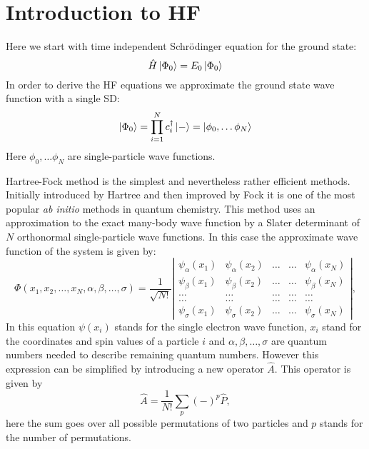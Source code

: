 \documentclass[twoside,english]{uiofysmaster}
\theoremstyle{definition}
\begin{document}
\section{Introduction to HF}
Here we start with time independent Schrödinger equation for the ground state:
\begin{equation}
\hat{H}\ket{\Phi_0}=E_0\ket{\Phi_0}
\end{equation}
In order to derive the HF equations we approximate the ground state wave function with a single SD:
\begin{equation}
\ket{\Phi_0}=\prod_{i=1}^{N}c_i^\dagger\ket{-}=\ket{\phi_0, \dots \phi_N}
\end{equation}
Here $\phi_0, \dots \phi_N$ are single-particle wave functions.

Hartree-Fock method is the simplest and nevertheless rather efficient methods. Initially introduced by Hartree and then improved by Fock it is one of the most popular \textit{ab initio} methods in quantum chemistry. This method uses an approximation to the exact many-body wave function by a Slater determinant of $N$ orthonormal single-particle wave functions. In this case the approximate wave function of the system is given by:
\begin{equation}
\Phi(x_1, x_2,\dots ,x_N,\alpha,\beta,\dots, \sigma)=\frac{1}{\sqrt{N!}}
\left| \begin{array}{ccccc} \psi_{\alpha}(x_1)& \psi_{\alpha}(x_2)& \dots & \dots & \psi_{\alpha}(x_N)\\
\psi_{\beta}(x_1)&\psi_{\beta}(x_2)& \dots & \dots & \psi_{\beta}(x_N)\\  
\dots & \dots & \dots & \dots & \dots \\
\dots & \dots & \dots & \dots & \dots \\
\psi_{\sigma}(x_1)&\psi_{\sigma}(x_2)& \dots & \dots & \psi_{\sigma}(x_N)\end{array} \right|, \label{eq:HartreeFockDet}
\end{equation}
In this equation $\psi(x_i)$ stands for the single electron wave function, $x_i$ stand for the coordinates and spin values of a particle $i$ and $\alpha, \beta,…,\sigma$ are quantum numbers needed to describe remaining quantum numbers.
However this expression can be simplified by introducing a new operator $\hat{A}$. This operator is given by 
\begin{equation}
\hat{A} = \frac{1}{N!}\sum_{p} (-)^p\hat{P},
\label{antiSymmetryOperator}
\end{equation}
here the sum goes over all possible permutations of two particles and $p$  stands for the number of permutations.\\
\end{document}
